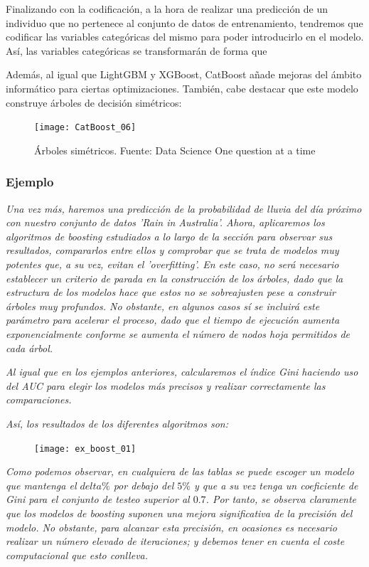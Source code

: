 \documentclass[12pt,twoside]{article}
\begin{document}
Finalizando con la codificación, a la hora de realizar una predicción de un individuo que no pertenece al conjunto de datos de entrenamiento, tendremos que codificar las variables categóricas del mismo para poder introducirlo en el modelo. Así, las variables categóricas se transformarán de forma que

Además, al igual que LightGBM y XGBoost, CatBoost añade mejoras del ámbito informático para ciertas optimizaciones. También, cabe destacar que este modelo construye árboles de decisión simétricos:
\begin{figure}[h]
\centering
\texttt{[image: CatBoost\_06]}
\caption{Árboles simétricos. Fuente: Data Science One question at a time}
\end{figure}




\subsubsection{Ejemplo} \label{ex:Boost}

\textit{Una vez más, haremos una predicción de la probabilidad de lluvia del día próximo con nuestro conjunto de datos 'Rain in Australia'. Ahora, aplicaremos los algoritmos de boosting estudiados a lo largo de la sección para observar sus resultados, compararlos entre ellos y comprobar que se trata de modelos muy potentes que, a su vez, evitan el 'overfitting'. En este caso, no será necesario establecer un criterio de parada en la construcción de los árboles, dado que la estructura de los modelos hace que estos no se sobreajusten pese a construir árboles muy profundos. No obstante, en algunos casos sí se incluirá este parámetro para acelerar el proceso, dado que el tiempo de ejecución aumenta exponencialmente conforme se aumenta el número de nodos hoja permitidos de cada árbol.}

\textit{Al igual que en los ejemplos anteriores, calcularemos el índice Gini haciendo uso del AUC para elegir los modelos más precisos y realizar correctamente las comparaciones.}

\textit{Así, los resultados de los diferentes algoritmos son:}

\begin{figure}[h]
\centering
\texttt{[image: ex\_boost\_01]}
\end{figure}

\textit{Como podemos observar, en cualquiera de las tablas se puede escoger un modelo que mantenga el $delta\%$ por debajo del $5\%$ y que a su vez tenga un coeficiente de Gini para el conjunto de testeo superior al $0.7$. Por tanto, se observa claramente que los modelos de boosting suponen una mejora significativa de la precisión del modelo. No obstante, para alcanzar esta precisión, en ocasiones es necesario realizar un número elevado de iteraciones; y debemos tener en cuenta el coste computacional que esto conlleva.}
\end{document}
